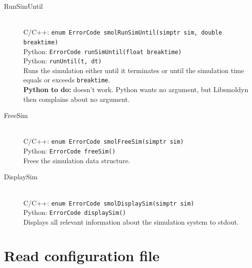 \documentclass {book}
\newcommand {\ttt} {\texttt}
\begin{document}
\begin{description}
\item[RunSimUntil]
\hfill \\
C/C++: \ttt{enum ErrorCode smolRunSimUntil(simptr sim, double breaktime)}\\
Python: \ttt{ErrorCode runSimUntil(float breaktime)}\\
Python: \ttt{runUntil(t, dt)}\\
Runs the simulation either until it terminates or until the simulation time equals or exceeds \ttt{breaktime}.\\
\textbf{Python to do:} doesn't work. Python wants no argument, but Libsmoldyn then complains about no argument.

\item[FreeSim]
\hfill \\
C/C++: \ttt{enum ErrorCode smolFreeSim(simptr sim)}\\
Python: \ttt{ErrorCode freeSim()}\\
Frees the simulation data structure.

\item[DisplaySim]
\hfill \\
C/C++: \ttt{enum ErrorCode smolDisplaySim(simptr sim)}\\
Python: \ttt{ErrorCode displaySim()}\\
Displays all relevant information about the simulation system to stdout.

\end{description}

\section{Read configuration file}
\end{document}
